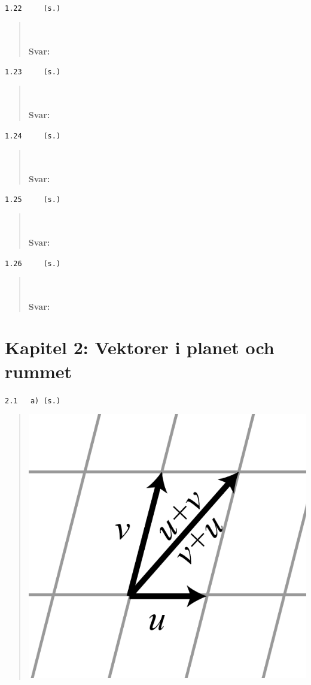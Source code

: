 \documentclass[a4paper]{article}
\newcommand{\tskcol}[1]{\textcolor{tskcol}{#1}}
\begin{document}
\texttt{\tskcol{1.22~~~~ (s.)}}
\begin{quotation}
	\noindent
	\\ \\
	\textbf{Svar:}
\end{quotation}

\texttt{\tskcol{1.23~~~~ (s.)}}
\begin{quotation}
	\noindent
	\\ \\
	\textbf{Svar:}
\end{quotation}

\texttt{\tskcol{1.24~~~~ (s.)}}
\begin{quotation}
	\noindent
	\\ \\
	\textbf{Svar:}
\end{quotation}

\texttt{\tskcol{1.25~~~~ (s.)}}
\begin{quotation}
	\noindent
	\\ \\
	\textbf{Svar:}
\end{quotation}

\texttt{\tskcol{1.26~~~~ (s.)}}
\begin{quotation}
	\noindent
	\\ \\
	\textbf{Svar:}
\end{quotation}

\pagebreak
\section*{Kapitel 2: Vektorer i planet och rummet}
\texttt{\tskcol{2.1~~~a) (s.)}}
\begin{quotation}
	\noindent
	\includegraphics[scale=0.2]{images/21a.PNG}
\end{quotation}
\end{document}
